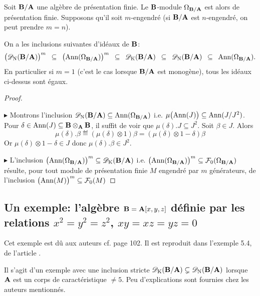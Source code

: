 \documentclass[12pt,twoside,a4paper]{article}
\begin{document}
\begin {theorem} %

Soit $\mathbf{B}/\mathbf{A}$ une algèbre de présentation finie. Le $\mathbf{B}$-module
$\Omega_{\mathbf{B}/\mathbf{A}}$ est alors de présentation finie. Supposons qu'il soit
$m$-engendré (si $\mathbf{B}/\mathbf{A}$ est $n$-engendré, on peut prendre $m=n$).

\smallskip\noindent  On a les inclusions suivantes d'idéaux de $\mathbf{B}$:
$$
\big(\mathscr{D}_{\rm N}(\mathbf{B}/\mathbf{A})\big)^m  \enspace\subseteq\enspace
\big(\mathrm{Ann}(\Omega_{\mathbf{B}/\mathbf{A}})\big)^m   \enspace\subseteq\enspace
\mathscr{D}_{\rm K}(\mathbf{B}/\mathbf{A})  \enspace\subseteq\enspace
\mathscr{D}_{\rm N}(\mathbf{B}/\mathbf{A})  \enspace\subseteq\enspace
\mathrm{Ann}(\Omega_{\mathbf{B}/\mathbf{A}}).
$$
En particulier si $m=1$ (c'est le cas lorsque $\mathbf{B}/\mathbf{A}$ est monogène),
tous les idéaux ci-dessus sont égaux.
\end {theorem}


\begin {proof} ~%

\noindent 
$\blacktriangleright$
Montrons l'inclusion $\mathscr{D}_{\rm N}(\mathbf{B}/\mathbf{A}) \subseteq \mathrm{Ann}(\Omega_{\mathbf{B}/\mathbf{A}})$ i.e. 
$\mu\big(\mathrm{Ann}(J)\big) \subseteq
\mathrm{Ann}(J/J^2)$. Pour $\delta \in \mathrm{Ann}(J) \subseteq \mathbf{B}\otimes_{\mathbf{A}}\mathbf{B}$,
il suffit de voir que $\mu(\delta).J \subseteq J^2$.  Soit
$\beta \in J$. Alors
$$
\mu(\delta).\beta \eqdef   (\mu(\delta)\otimes 1)\beta
= (\mu(\delta)\otimes 1 - \delta)\beta
$$
Or $\mu(\delta)\otimes 1 - \delta \in J$ donc $\mu(\delta).\beta \in J^2$.

\medskip\noindent 
$\blacktriangleright$
L'inclusion $\big(\mathrm{Ann}(\Omega_{\mathbf{B}/\mathbf{A}})\big)^m \subseteq
\mathscr{D}_{\rm K}(\mathbf{B}/\mathbf{A})$ i.e. $\big(\mathrm{Ann}(\Omega_{\mathbf{B}/\mathbf{A}})\big)^m \subseteq {\cal F}_0(\Omega_{\mathbf{B}/\mathbf{A}})$ résulte,
pour tout module de présentation finie $M$ engendré par $m$ générateurs,
de l'inclusion $\big(\mathrm{Ann}(M)\big)^m \subseteq {\cal F}_0(M)$
\end {proof}

\subsection{Un exemple: l'algèbre $\mathbf{B} = \mathbf{A}[x,y,z]$ définie par les relations
$x^2=y^2=z^2$, $xy=xz=yz=0$}


Cet exemple est dû aux auteurs  \cite{ScSt74} cf. page 102.
Il est reproduit dans l'exemple 5.4, de l'article \cite{IyTa}. 

Il s'agit d'un exemple avec une inclusion stricte $\mathscr{D}_{\rm K}(\mathbf{B}/\mathbf{A}) \subsetneq \mathscr{D}_{\rm N}(\mathbf{B}/\mathbf{A})$ lorsque
$\mathbf{A}$ est un corps de caractéristique $\ne 5$. Peu d'explications sont fournies chez les auteurs
mentionnés.
\end{document}
